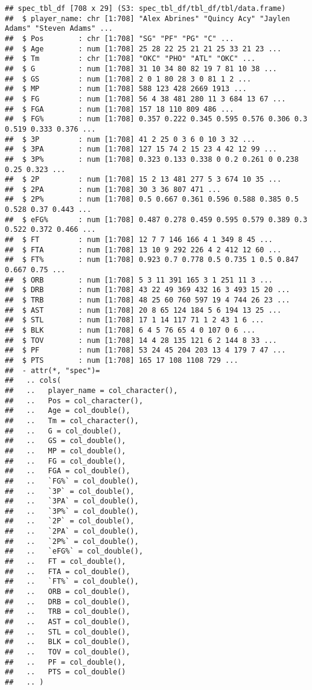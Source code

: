\documentclass[
]{article}
\begin{document}
\begin{verbatim}
## spec_tbl_df [708 x 29] (S3: spec_tbl_df/tbl_df/tbl/data.frame)
##  $ player_name: chr [1:708] "Alex Abrines" "Quincy Acy" "Jaylen Adams" "Steven Adams" ...
##  $ Pos        : chr [1:708] "SG" "PF" "PG" "C" ...
##  $ Age        : num [1:708] 25 28 22 25 21 21 25 33 21 23 ...
##  $ Tm         : chr [1:708] "OKC" "PHO" "ATL" "OKC" ...
##  $ G          : num [1:708] 31 10 34 80 82 19 7 81 10 38 ...
##  $ GS         : num [1:708] 2 0 1 80 28 3 0 81 1 2 ...
##  $ MP         : num [1:708] 588 123 428 2669 1913 ...
##  $ FG         : num [1:708] 56 4 38 481 280 11 3 684 13 67 ...
##  $ FGA        : num [1:708] 157 18 110 809 486 ...
##  $ FG%        : num [1:708] 0.357 0.222 0.345 0.595 0.576 0.306 0.3 0.519 0.333 0.376 ...
##  $ 3P         : num [1:708] 41 2 25 0 3 6 0 10 3 32 ...
##  $ 3PA        : num [1:708] 127 15 74 2 15 23 4 42 12 99 ...
##  $ 3P%        : num [1:708] 0.323 0.133 0.338 0 0.2 0.261 0 0.238 0.25 0.323 ...
##  $ 2P         : num [1:708] 15 2 13 481 277 5 3 674 10 35 ...
##  $ 2PA        : num [1:708] 30 3 36 807 471 ...
##  $ 2P%        : num [1:708] 0.5 0.667 0.361 0.596 0.588 0.385 0.5 0.528 0.37 0.443 ...
##  $ eFG%       : num [1:708] 0.487 0.278 0.459 0.595 0.579 0.389 0.3 0.522 0.372 0.466 ...
##  $ FT         : num [1:708] 12 7 7 146 166 4 1 349 8 45 ...
##  $ FTA        : num [1:708] 13 10 9 292 226 4 2 412 12 60 ...
##  $ FT%        : num [1:708] 0.923 0.7 0.778 0.5 0.735 1 0.5 0.847 0.667 0.75 ...
##  $ ORB        : num [1:708] 5 3 11 391 165 3 1 251 11 3 ...
##  $ DRB        : num [1:708] 43 22 49 369 432 16 3 493 15 20 ...
##  $ TRB        : num [1:708] 48 25 60 760 597 19 4 744 26 23 ...
##  $ AST        : num [1:708] 20 8 65 124 184 5 6 194 13 25 ...
##  $ STL        : num [1:708] 17 1 14 117 71 1 2 43 1 6 ...
##  $ BLK        : num [1:708] 6 4 5 76 65 4 0 107 0 6 ...
##  $ TOV        : num [1:708] 14 4 28 135 121 6 2 144 8 33 ...
##  $ PF         : num [1:708] 53 24 45 204 203 13 4 179 7 47 ...
##  $ PTS        : num [1:708] 165 17 108 1108 729 ...
##  - attr(*, "spec")=
##   .. cols(
##   ..   player_name = col_character(),
##   ..   Pos = col_character(),
##   ..   Age = col_double(),
##   ..   Tm = col_character(),
##   ..   G = col_double(),
##   ..   GS = col_double(),
##   ..   MP = col_double(),
##   ..   FG = col_double(),
##   ..   FGA = col_double(),
##   ..   `FG%` = col_double(),
##   ..   `3P` = col_double(),
##   ..   `3PA` = col_double(),
##   ..   `3P%` = col_double(),
##   ..   `2P` = col_double(),
##   ..   `2PA` = col_double(),
##   ..   `2P%` = col_double(),
##   ..   `eFG%` = col_double(),
##   ..   FT = col_double(),
##   ..   FTA = col_double(),
##   ..   `FT%` = col_double(),
##   ..   ORB = col_double(),
##   ..   DRB = col_double(),
##   ..   TRB = col_double(),
##   ..   AST = col_double(),
##   ..   STL = col_double(),
##   ..   BLK = col_double(),
##   ..   TOV = col_double(),
##   ..   PF = col_double(),
##   ..   PTS = col_double()
##   .. )
\end{verbatim}
\end{document}

